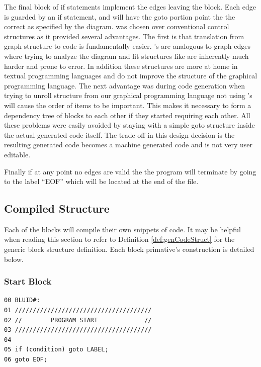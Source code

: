 The final block of if statements implement the edges leaving the block. 
Each edge is guarded by an if statement, and will have the goto portion 
point the the correct  as specified by the diagram. 
 was chosen over conventional control structures as it
provided several advantages. The first is that translation from graph 
structure to code is fundamentally easier. 's are analogous 
to graph edges where trying to analyze the diagram and fit structures 
like   are inherently much harder and 
prone to error. In addition these structures are more at home in textual 
programming languages and do not improve the structure of the 
graphical programming language. The next advantage was during code 
generation when trying to unroll structure from our graphical programming language 
not using 's will cause the order of items to be important. This
makes it necessary to form a dependency tree of blocks to each other if they 
started requiring each other. All these problems were easily avoided by staying 
with a simple goto structure inside the actual 
generated  code itself. The trade off in this 
design decision is the resulting generated code becomes a machine 
generated code and is not very user editable. 

Finally if at any point no edges are valid the the program will 
terminate by going to the label ``EOF'' which will be located 
at the end of the file.


\subsection{Compiled Structure}
\label{compiler}

Each of the blocks will compile their own snippets of code. 
It may be helpful when reading this section to refer to 
Definition \ref{def:genCodeStruct} for the generic block 
structure definition. Each block primative's construction
is detailed below.

\subsubsection{Start Block}
\label{def:cmpstartblock}
\begin{lstlisting}[frame=single]
00 BLUID#:
01 //////////////////////////////////////
02 //        PROGRAM START             //
03 //////////////////////////////////////
04 
05 if (condition) goto LABEL;
06 goto EOF;
\end{lstlisting}

